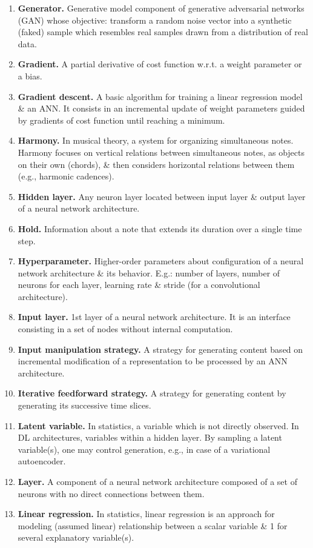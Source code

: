 \documentclass{article}
\begin{document}
\begin{itemize}
\begin{enumerate}
		\item {\bf Generator.} Generative model component of generative adversarial networks (GAN) whose objective: transform a random noise vector into a synthetic (faked) sample which resembles real samples drawn from a distribution of real data.
		\item {\bf Gradient.} A partial derivative of cost function w.r.t. a weight parameter or a bias.
		\item {\bf Gradient descent.} A basic algorithm for training a linear regression model \& an ANN. It consists in an incremental update of weight parameters guided by gradients of cost function until reaching a minimum.
		\item {\bf Harmony.} In musical theory, a system for organizing simultaneous notes. Harmony focuses on vertical relations between simultaneous notes, as objects on their own (chords), \& then considers horizontal relations between them (e.g., harmonic cadences).
		\item {\bf Hidden layer.} Any neuron layer located between input layer \& output layer of a neural network architecture.
		\item {\bf Hold.} Information about a note that extends its duration over a single time step.
		\item {\bf Hyperparameter.} Higher-order parameters about configuration of a neural network architecture \& its behavior. E.g.: number of layers, number of neurons for each layer, learning rate \& stride (for a convolutional architecture).
		\item {\bf Input layer.} 1st layer of a neural network architecture. It is an interface consisting in a set of nodes without internal computation.
		\item {\bf Input manipulation strategy.} A strategy for generating content based on incremental modification of a representation to be processed by an ANN architecture.
		\item {\bf Iterative feedforward strategy.} A strategy for generating content by generating its successive time slices.
		\item {\bf Latent variable.} In statistics, a variable which is not directly observed. In DL architectures, variables within a hidden layer. By sampling a latent variable(s), one may control generation, e.g., in case of a variational autoencoder.
		\item {\bf Layer.} A component of a neural network architecture composed of a set of neurons with no direct connections between them.
		\item {\bf Linear regression.} In statistics, linear regression is an approach for modeling (assumed linear) relationship between a scalar variable \& 1 for several explanatory variable(s).

\end{enumerate}
\end{itemize}
\end{document}
